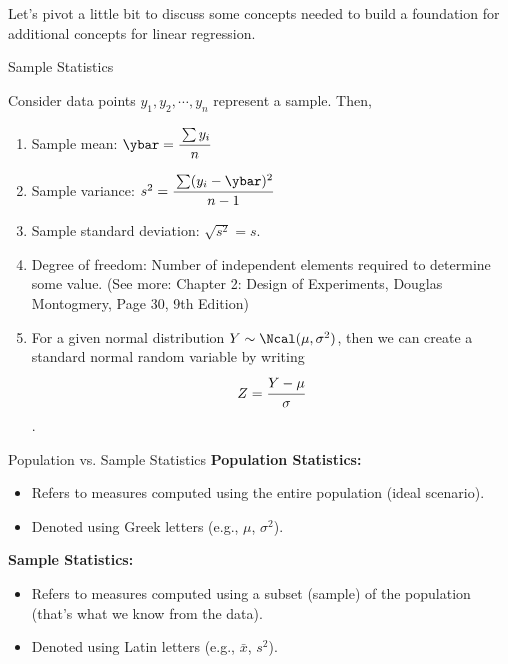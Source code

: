 \documentclass[aspectratio=169,xcolor=dvipsnames,svgnames,x11names,fleqn]{beamer}
\begin{document}
    \begin{frame}{}
    \Large
    \begin{center}
        Let's pivot a little bit to discuss some concepts needed to build a foundation for additional concepts for linear regression.
    \end{center}
            
    \end{frame}
    
    \begin{frame}{Sample Statistics}
        
        \footnotesize

    Consider data points $y_1, y_2, \cdots, y_n$ represent a sample. Then,
    \begin{enumerate}
        \item Sample mean: $\ybar = \cfrac{\sum y_i}{n}$
        \item Sample variance: $s^2 = \cfrac{\sum (y_i - \ybar)^2}{n-1}$
        \item Sample standard deviation: $\sqrt{s^2} = s$.
        \item Degree of freedom: Number of independent elements required to determine some value. (See more: Chapter 2: Design of Experiments, Douglas Montogmery, Page 30, 9th Edition)
        \item For a given normal distribution $Y\sim \Ncal(\mu, \sigma^2)$, then we can create a standard normal random variable by writing $$ Z = \cfrac{Y - \mu }{\sigma}$$.
    \end{enumerate}

    \end{frame}


\begin{frame}{Population vs. Sample Statistics}
    \textbf{Population Statistics:}
    \begin{itemize}
        \item Refers to measures computed using the entire population (ideal scenario).
        \item Denoted using Greek letters (e.g., $\mu$, $\sigma^2$).
    \end{itemize}
    \vspace{10pt}
    \textbf{Sample Statistics:}
    \begin{itemize}
        \item Refers to measures computed using a subset (sample) of the population (that's what we know from the data).
        \item Denoted using Latin letters (e.g., $\bar{x}$, $s^2$).
    \end{itemize}
    \end{frame}
\end{document}
